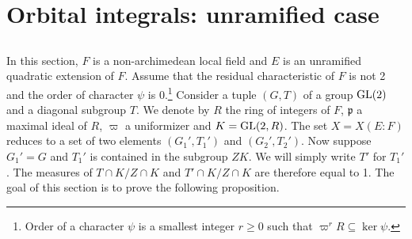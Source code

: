 \section{Orbital integrals: unramified case}

\subsection{}
In this section, $F$ is a non-archimedean local field and $E$ is an unramified quadratic extension of $F$.
Assume that the residual characteristic of $F$ is not 2 and the order of character $\psi$ is 0.\footnote{Order of a character $\psi$ is a smallest integer $r\geq 0$ such that $\varpi ^r R \subseteq \ker \psi$.}
Consider a tuple $(G, T)$ of a group $\mathrm{GL}(2)$ and a diagonal subgroup $T$.
We denote by $R$ the ring of integers of $F$, $\mathfrak{p}$ a maximal ideal of $R$, $\varpi$ a  uniformizer and $K = \mathrm{GL}(2, R)$.
The set $X = X(E:F)$ reduces to a set of two elements $(G_1', T_1')$ and $(G_2', T_2')$.
Now suppose $G_1' = G$ and $T_1'$ is contained in the subgroup $ZK$.
We will simply write $T'$ for $T_1'$.
The measures of $T\cap K / Z \cap K$ and $T' \cap K / Z\cap K$ are therefore equal to 1.
The goal of this section is to prove the following proposition.

